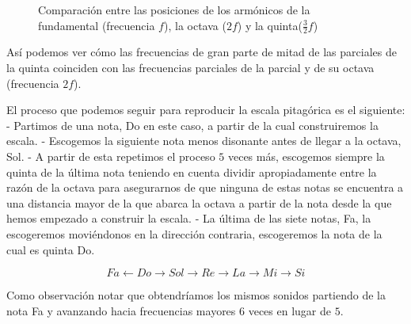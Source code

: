 \documentclass[11pt,a4paper]{article}
\begin{document}
    \begin{figure}[h]
        \centering
        \caption{Comparación entre las posiciones de los armónicos de la fundamental (frecuencia $f$), la octava ($2f$) y la quinta($\frac{3}{2} f$)}
    \end{figure}
    
    
	Así podemos ver cómo las frecuencias de gran parte de mitad de las parciales de la quinta coinciden con las frecuencias parciales de la parcial y de su octava (frecuencia $2f$).
	
	El proceso que podemos seguir para reproducir la escala pitagórica es el siguiente:
		- Partimos de una nota, Do en este caso, a partir de la cual construiremos la escala.
		- Escogemos la siguiente nota menos disonante antes de llegar a la octava, Sol.
		- A partir de esta repetimos el proceso $5$ veces más, escogemos siempre la quinta de la última nota teniendo en cuenta dividir apropiadamente entre la razón de la octava para asegurarnos de que ninguna de estas notas se encuentra a una distancia mayor de la que abarca la octava a partir de la nota desde la que hemos empezado a construir la escala.
	   - La última de las siete notas, Fa, la escogeremos moviéndonos en la dirección contraria, escogeremos la nota de la cual es quinta Do.
	   
	 $$
		Fa \longleftarrow Do \longrightarrow Sol \longrightarrow Re \longrightarrow La \longrightarrow Mi \longrightarrow Si 
	 $$
	  
    Como observación notar que obtendríamos los mismos sonidos partiendo de la nota Fa y avanzando hacia frecuencias mayores $6$ veces en lugar de $5$.		
		
\end{document}
